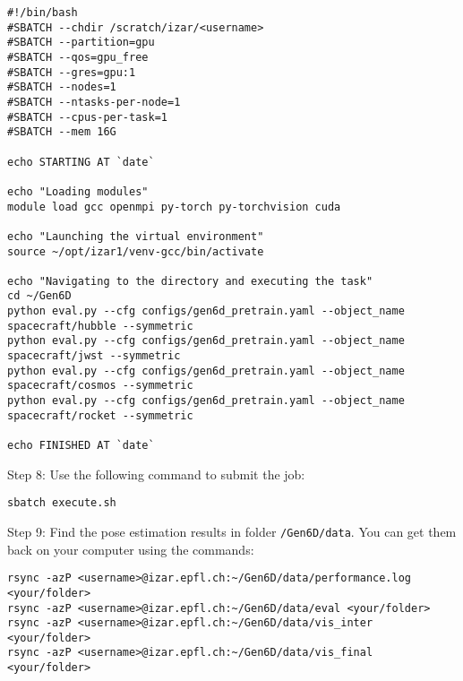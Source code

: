 \bigskip

\begin{lstlisting}[style=bashstyle, caption={Bash script \texttt{execute.sh} to run a machine learning model on Scitas Izar EPFL. While the overall structure remains consistent, this script is specific to Gen6D's architecture.}]
#!/bin/bash
#SBATCH --chdir /scratch/izar/<username>
#SBATCH --partition=gpu
#SBATCH --qos=gpu_free
#SBATCH --gres=gpu:1
#SBATCH --nodes=1
#SBATCH --ntasks-per-node=1
#SBATCH --cpus-per-task=1
#SBATCH --mem 16G

echo STARTING AT `date`

echo "Loading modules"
module load gcc openmpi py-torch py-torchvision cuda

echo "Launching the virtual environment"
source ~/opt/izar1/venv-gcc/bin/activate

echo "Navigating to the directory and executing the task"
cd ~/Gen6D                                    
python eval.py --cfg configs/gen6d_pretrain.yaml --object_name spacecraft/hubble --symmetric
python eval.py --cfg configs/gen6d_pretrain.yaml --object_name spacecraft/jwst --symmetric
python eval.py --cfg configs/gen6d_pretrain.yaml --object_name spacecraft/cosmos --symmetric
python eval.py --cfg configs/gen6d_pretrain.yaml --object_name spacecraft/rocket --symmetric

echo FINISHED AT `date`
\end{lstlisting}

\bigskip


\noindent Step 8: Use the following command to submit the job:
{ \captionsetup{labelformat=empty,labelsep=none}
\begin{lstlisting}[style=bashstyle, caption=\null]
sbatch execute.sh
\end{lstlisting}
}

\vspace{-0.4cm}

\noindent Step 9: Find the pose estimation results in folder \texttt{/Gen6D/data}. You can get them back on your computer using the commands:
{ \captionsetup{labelformat=empty,labelsep=none}
\begin{lstlisting}[style=bashstyle, caption=\null, keywordstyle=\color{black}]
rsync -azP <username>@izar.epfl.ch:~/Gen6D/data/performance.log <your/folder>
rsync -azP <username>@izar.epfl.ch:~/Gen6D/data/eval <your/folder>
rsync -azP <username>@izar.epfl.ch:~/Gen6D/data/vis_inter <your/folder>
rsync -azP <username>@izar.epfl.ch:~/Gen6D/data/vis_final <your/folder>
\end{lstlisting}
}

